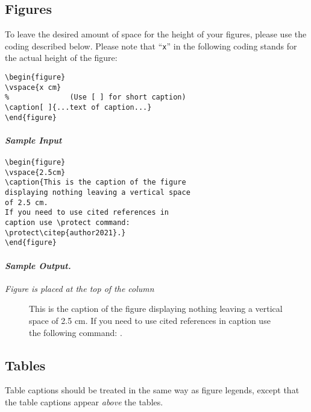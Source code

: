 \documentclass[usenatbib]{tjaa}
\begin{document}
\subsection{Figures}

To leave the desired amount of space for the height of your figures, please
use the coding described below.
Please note that ``\verb|x|'' in the following coding stands for the actual
height of the figure:
\begin{verbatim}
\begin{figure}
\vspace{x cm}
%              (Use [ ] for short caption)
\caption[ ]{...text of caption...}
\end{figure}
\end{verbatim}
\paragraph*{\itshape Sample Input}
\begin{verbatim}
\begin{figure}
\vspace{2.5cm}
\caption{This is the caption of the figure
displaying nothing leaving a vertical space
of 2.5 cm.
If you need to use cited references in
caption use \protect command:
\protect\citep{author2021}.}
\end{figure}
\end{verbatim}
\paragraph*{\itshape Sample Output.}{\itshape Figure is placed at the top of the column} 
\begin{figure}
\vspace{2.5cm}
\caption{%
This is the caption of the figure displaying nothing leaving a vertical space
of 2.5 cm. If you need to use cited references in caption use the following
command: \usebox{\verbbox}.}
\end{figure}

% - - - - - - - - - - - - - - - - - - - - - - - - - - - - - - - - - - -
\newpage
\subsection{Tables}

Table captions should be treated in the same way as figure legends, except
that the table captions appear {\itshape above} the tables. 
\end{document}

